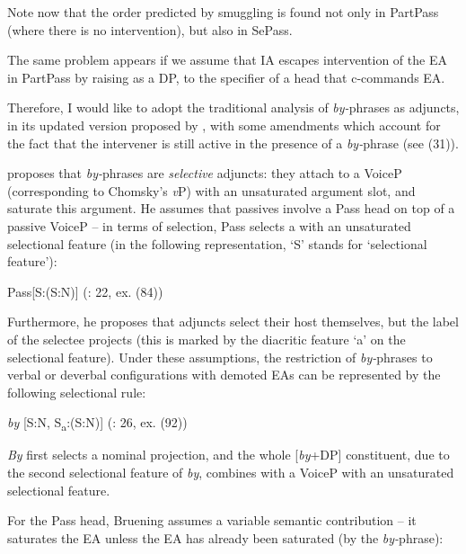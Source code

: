 \documentclass[output=paper]{langsci/langscibook}
\begin{document}
Note now that the order predicted by smuggling is found not only in PartPass (where there is no intervention), but also in SePass. 

  The same problem appears if we assume that IA escapes intervention of the EA in PartPass by raising as a DP, to the specifier of a head that c-commands EA.

  Therefore, I would like to adopt the traditional analysis of \textit{by-}phrases as adjuncts, in its updated version proposed by \citet{Bruening2012}, with some amendments which account for the fact that the intervener is still active in the presence of a \textit{by-}phrase (see (31)).

    \z

\citet{Bruening2012} proposes that \textit{by-}phrases are \textit{selective} adjuncts: they attach to a VoiceP (corresponding to Chomsky’s \textit{v}P) with an unsaturated argument slot, and saturate this argument. He assumes that passives involve a Pass head on top of a passive VoiceP – in terms of selection, Pass selects a  with an unsaturated selectional feature (in the following representation, ‘S' stands for ‘selectional feature'):

\ea%
    \label{ex:giurgea:32}
    Pass[S:(S:N)]  (\citealt{Bruening2012}: 22, ex. (84))
\z

Furthermore, he proposes that adjuncts select their host themselves, but the label of the selectee projects (this is marked by the diacritic feature ‘a' on the selectional feature). Under these assumptions, the restriction of \textit{by-}phrases to verbal or deverbal configurations with demoted EAs can be represented by the following selectional rule:

\ea%
    \label{ex:giurgea:33}
    \textit{by} [S:N, S\textsubscript{a}:(S:N)]  (\citealt{Bruening2012}: 26, ex. (92))
\z

\textit{By} first selects a nominal projection, and the whole [\textit{by}+DP] constituent, due to the second selectional feature of \textit{by}, combines with a VoiceP with an unsaturated selectional feature. 

For the Pass head, Bruening assumes a variable semantic contribution – it saturates the EA unless the EA has already been saturated (by the \textit{by-}phrase):
\end{document}
